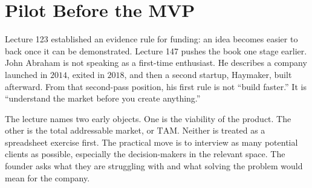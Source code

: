 \documentclass[11pt,oneside]{book}
\begin{document}

\section{Pilot Before the MVP}

Lecture 123 established an evidence rule for funding: an idea becomes easier to back once it can be demonstrated. Lecture 147 pushes the book one stage earlier. John Abraham is not speaking as a first-time enthusiast. He describes a company launched in \(2014\), exited in \(2018\), and then a second startup, Haymaker, built afterward. From that second-pass position, his first rule is not ``build faster.'' It is ``understand the market before you create anything.''

The lecture names two early objects. One is the viability of the product. The other is the total addressable market, or \(\mathrm{TAM}\). Neither is treated as a spreadsheet exercise first. The practical move is to interview as many potential clients as possible, especially the decision-makers in the relevant space. The founder asks what they are struggling with and what solving the problem would mean for the company.
\end{document}
